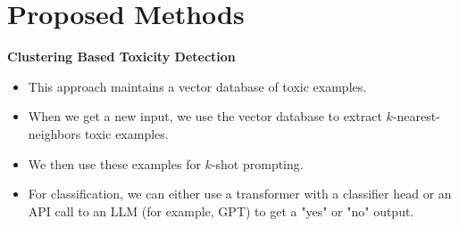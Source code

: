 \section{Proposed Methods}
\textbf{Clustering Based Toxicity Detection
}
\begin{itemize}
    \item This approach maintains a vector database of toxic examples.
    \item When we get a new input, we use the vector database to extract $k$-nearest-neighbors toxic examples.
    \item We then use these examples for $k$-shot prompting. 
    \item For classification, we can either use a transformer with a classifier head or an API call to an LLM (for example, GPT) to get a "yes" or "no" output.
\end{itemize}